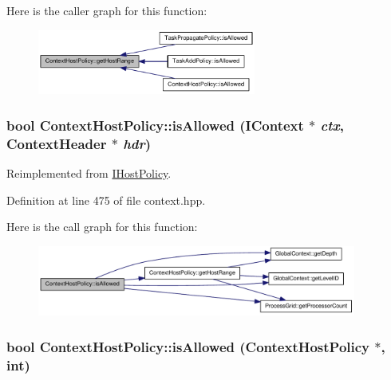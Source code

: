 Here is the caller graph for this function:\nopagebreak
\begin{figure}[H]
\begin{center}
\leavevmode
\includegraphics[width=203pt]{class_context_host_policy_aff4f859ac0102e7ad268f17aff1b0259_icgraph}
\end{center}
\end{figure}
\hypertarget{class_context_host_policy_aa10ca0985dfed1351b9ef69fbe97f1f4}{
\subsubsection[{isAllowed}]{\setlength{\rightskip}{0pt plus 5cm}bool ContextHostPolicy::isAllowed ({\bf IContext} $\ast$ {\em ctx}, \/  {\bf ContextHeader} $\ast$ {\em hdr})}}
\label{class_context_host_policy_aa10ca0985dfed1351b9ef69fbe97f1f4}


Reimplemented from \hyperlink{class_i_host_policy_a5200e3143a640e492438361a3fd2626a}{IHostPolicy}.

Definition at line 475 of file context.hpp.

Here is the call graph for this function:\nopagebreak
\begin{figure}[H]
\begin{center}
\leavevmode
\includegraphics[width=297pt]{class_context_host_policy_aa10ca0985dfed1351b9ef69fbe97f1f4_cgraph}
\end{center}
\end{figure}
\hypertarget{class_context_host_policy_ada4604e88c103b12a8d2a2a8c533dada}{
\subsubsection[{isAllowed}]{\setlength{\rightskip}{0pt plus 5cm}bool ContextHostPolicy::isAllowed ({\bf ContextHostPolicy} $\ast$, \/  int)}}
\label{class_context_host_policy_ada4604e88c103b12a8d2a2a8c533dada}


